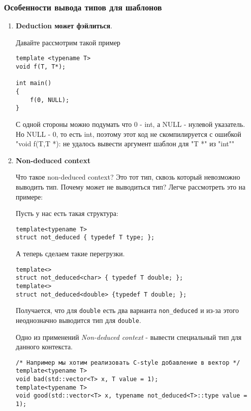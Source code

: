 		\subsubsection{Особенности вывода типов для шаблонов}
			\begin{enumerate}
				\item \textbf{Deduction может фэйлиться}.
				
				Давайте рассмотрим такой пример
\begin{verbatim}
template <typename T>
void f(T, T*);

int main()
{
	f(0, NULL);
}
				\end{verbatim}
				С одной стороны можно подумать что 0 - int, а NULL - нулевой указатель. Но NULL - 0, то есть int, поэтому этот код не скомпилируется с ошибкой "void f(T,T *): не удалось вывести аргумент шаблон для "T *" из "int""
				
				\item \textbf{Non-deduced context}
				
				Что такое non-deduced context? Это тот тип, сквозь который невозможно выводить тип. Почему может не выводиться тип? Легче рассмотреть это на примере:
				
				Пусть у нас есть такая структура:
\begin{verbatim}
template<typename T>
struct not_deduced { typedef T type; };
\end{verbatim}
				А теперь сделаем такие перегрузки.
\begin{verbatim}
template<>
struct not_deduced<char> { typedef T double; };
template<>
struct not_deduced<double> {typedef T double; };
\end{verbatim}
				Получается, что для \texttt{double} есть два варианта \texttt{non_deduced} и из-за этого неоднозначно выводится тип для \texttt{double}. 
				
				Одно из применений \textit{Non-deduced context} - вывести специальный тип для данного контекста.
\begin{verbatim}
/* Например мы хотим реализовать С-style добавление в вектор */
template<typename T>
void bad(std::vector<T> x, T value = 1);
template<typename T>
void good(std::vector<T> x, typename not_deduced<T>::type value = 1);


\end{verbatim}
\end{enumerate}
